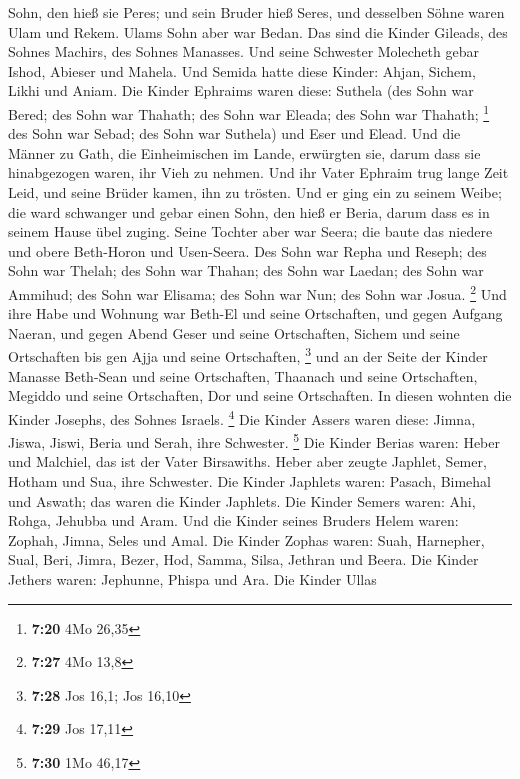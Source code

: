 Sohn, den hieß sie Peres; und sein Bruder hieß Seres, und desselben
Söhne waren Ulam und Rekem.  Ulams Sohn aber war Bedan. Das
sind die Kinder Gileads, des Sohnes Machirs, des Sohnes Manasses.
 Und seine Schwester Molecheth gebar Ishod, Abieser und
Mahela.  Und Semida hatte diese Kinder: Ahjan, Sichem,
Likhi und Aniam.  Die Kinder Ephraims waren diese: Suthela
(des Sohn war Bered; des Sohn war Thahath; des Sohn war Eleada; des Sohn
war Thahath; \footnote{\textbf{7:20} 4Mo 26,35}  des Sohn
war Sebad; des Sohn war Suthela) und Eser und Elead. Und die Männer zu
Gath, die Einheimischen im Lande, erwürgten sie, darum dass sie
hinabgezogen waren, ihr Vieh zu nehmen.  Und ihr Vater
Ephraim trug lange Zeit Leid, und seine Brüder kamen, ihn zu trösten.
 Und er ging ein zu seinem Weibe; die ward schwanger und
gebar einen Sohn, den hieß er Beria, darum dass es in seinem Hause übel
zuging.  Seine Tochter aber war Seera; die baute das
niedere und obere Beth-Horon und Usen-Seera.  Des Sohn war
Repha und Reseph; des Sohn war Thelah; des Sohn war Thahan;
 des Sohn war Laedan; des Sohn war Ammihud; des Sohn war
Elisama;  des Sohn war Nun; des Sohn war Josua. \footnote{\textbf{7:27}
  4Mo 13,8}  Und ihre Habe und Wohnung war Beth-El und
seine Ortschaften, und gegen Aufgang Naeran, und gegen Abend Geser und
seine Ortschaften, Sichem und seine Ortschaften bis gen Ajja und seine
Ortschaften, \footnote{\textbf{7:28} Jos 16,1; Jos 16,10} 
und an der Seite der Kinder Manasse Beth-Sean und seine Ortschaften,
Thaanach und seine Ortschaften, Megiddo und seine Ortschaften, Dor und
seine Ortschaften. In diesen wohnten die Kinder Josephs, des Sohnes
Israels. \footnote{\textbf{7:29} Jos 17,11}  Die Kinder
Assers waren diese: Jimna, Jiswa, Jiswi, Beria und Serah, ihre
Schwester. \footnote{\textbf{7:30} 1Mo 46,17}  Die Kinder
Berias waren: Heber und Malchiel, das ist der Vater Birsawiths.
 Heber aber zeugte Japhlet, Semer, Hotham und Sua, ihre
Schwester.  Die Kinder Japhlets waren: Pasach, Bimehal und
Aswath; das waren die Kinder Japhlets.  Die Kinder Semers
waren: Ahi, Rohga, Jehubba und Aram.  Und die Kinder seines
Bruders Helem waren: Zophah, Jimna, Seles und Amal.  Die
Kinder Zophas waren: Suah, Harnepher, Sual, Beri, Jimra, 
Bezer, Hod, Samma, Silsa, Jethran und Beera.  Die Kinder
Jethers waren: Jephunne, Phispa und Ara.  Die Kinder Ullas
